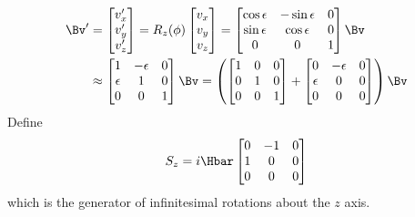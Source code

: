 \begin{equation}\label{eqn:PHY356FDec7:55}
\begin{aligned}
\Bv' &=
\begin{bmatrix}
v_x'  \\
v_y' \\
v_z'
\end{bmatrix}
=
R_z(\phi)
\begin{bmatrix}
v_x \\
v_y \\
v_z
\end{bmatrix}
=
\begin{bmatrix}
\cos \epsilon &- \sin\epsilon & 0 \\
\sin \epsilon & \cos\epsilon & 0 \\
0 & 0 & 1
\end{bmatrix}
\Bv \\
&\approx
\begin{bmatrix}
1 &- \epsilon & 0 \\
\epsilon & 1 & 0 \\
0 & 0 & 1
\end{bmatrix}
\Bv
=
\left(
\begin{bmatrix}
1 & 0 & 0 \\
0 & 1 & 0 \\
0 & 0 & 1
\end{bmatrix}
+
\begin{bmatrix}
0 &- \epsilon & 0 \\
\epsilon & 0 & 0 \\
0 & 0 & 0
\end{bmatrix}
\right)
\Bv
\end{aligned}
\end{equation}
%
Define
\begin{equation}\label{eqn:PHY356FDec7:60}
S_z = i \Hbar
\begin{bmatrix}
0 &- 1 & 0 \\
1 & 0 & 0 \\
0 & 0 & 0
\end{bmatrix}
\end{equation}
%
which is the generator of infinitesimal rotations about the \(z\) axis.

